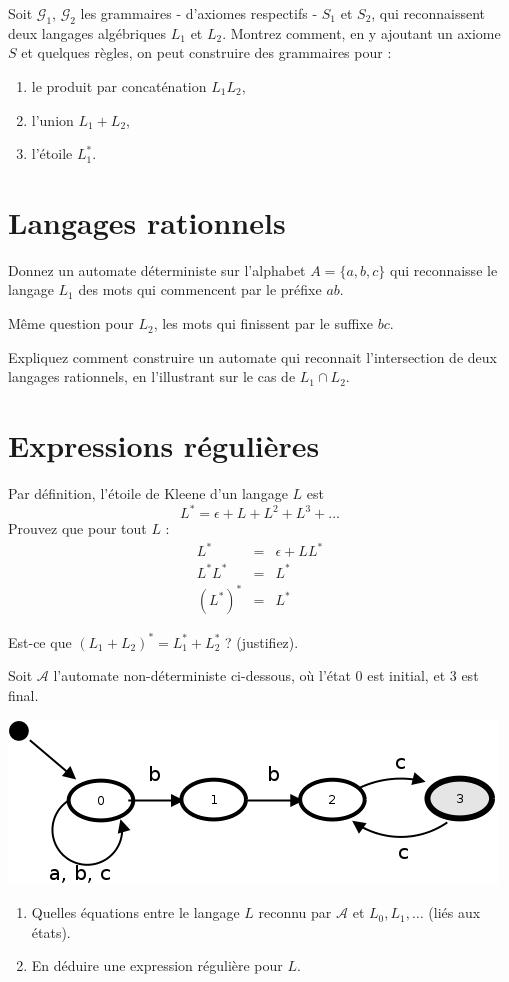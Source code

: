 \documentclass[twoside,11pt]{article}
\begin{document}
\begin{multicols*}{2}
\Q Soit $\mathcal{G}_1$, $\mathcal{G}_2$ les grammaires - d'axiomes
respectifs - $S_1$ et $ S_2$, qui reconnaissent deux langages
algébriques $L_1$ et $L_2$.  Montrez comment, en y ajoutant un axiome
$S$ et quelques règles, on peut construire des grammaires pour :
\begin{enumerate}
\item le produit par concaténation $L_1  L_2$,
\item l'union $L_1 + L_2$,
\item l'étoile $L_1^*$.
\end{enumerate}


\section{Langages rationnels}


\Q Donnez un automate déterministe sur l'alphabet $A = \{a, b, c\}$
 qui reconnaisse le langage
$L_1$ des mots qui commencent par le préfixe $ab$.

\Q Même question pour 
$L_2$, les mots qui finissent par le suffixe $bc$.

\Q Expliquez comment construire un automate qui reconnait l'intersection
de deux langages rationnels, en l'illustrant sur le cas de  $L_1 \cap L_2$.

\section{Expressions régulières}


\Q  Par définition, l'étoile de Kleene d'un langage $L$ est 
$$L^* = \epsilon + L + L^2 + L^3 + \ldots$$
Prouvez que pour tout $L$ :
\begin{eqnarray}
L^* &=& \epsilon + L L^* \\
L^* L^* &=& L^* \\
{(L^*)}^*  &=&  L^*
\end{eqnarray}



\Q Est-ce que $ (L_1 + L_2)^*  = L_1^* + L_2^* $ ? (justifiez).

\Q Soit $\mathcal{A}$ l'automate non-déterministe ci-dessous, où
l'état 0 est initial, et 3 est final.
\begin{center}
\includegraphics[width=\linewidth]{../dia/bbc}
\end{center}
\begin{enumerate}
\item Quelles équations entre le langage $L$ reconnu par $\mathcal{A}$
et $L_0, L_1, \ldots$ (liés aux états).
\item En déduire une expression régulière pour $L$.
\end{enumerate}

\end{multicols*}
\end{document}
